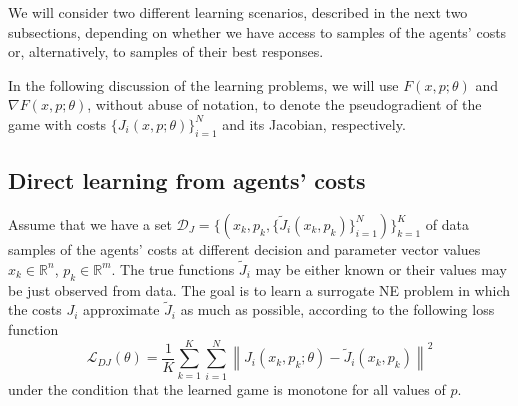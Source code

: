 \documentclass[11pt, a4paper]{article}
\newcommand{\rr}{\mathbb{R}}
\newcommand{\DD}{\mathcal{D}}
\newcommand{\LL}{\mathcal{L}}
\theoremstyle{remark}
\theoremstyle{plain}
\begin{document}
We will consider two different learning scenarios, described in the next two subsections, depending on whether we have access to samples of the agents' costs or, alternatively, to samples of their best responses.

In the following discussion of the learning problems, we will use $F(x,p;\theta)$ and $\nabla F(x,p;\theta)$, without abuse of notation, to denote the pseudogradient of the game with costs $\{J_i(x,p;\theta)\}_{i=1}^N$ and its Jacobian, respectively.

\subsection{Direct learning from agents' costs}
Assume that we have a set $\DD_J=\{(x_k,p_k,\{\tilde J_i(x_k,p_k)\}_{i=1}^N)\}_{k=1}^K$ of 
data samples of the agents' costs at different decision and parameter vector values $x_k\in\rr^n$, $p_k\in\rr^m$.
The true functions $\tilde J_i$ may be either known or their values may be just observed from data.
The goal is to learn a surrogate NE problem in which the costs $J_i$ approximate $\tilde J_i$ as much as possible,
according to the following loss function 
\begin{equation}
\LL_{DJ}(\theta)=\frac{1}{K}\sum_{k=1}^K \sum_{i=1}^N \left\| J_i(x_k,p_k;\theta) - \tilde J_i(x_k,p_k) \right\|^2
\label{eq:training_problem-J}
\end{equation}
under the condition that the learned game is monotone for all values of $p$.
\end{document}

